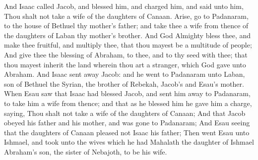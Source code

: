 \begin{biblechapter} %
\verse And Isaac called Jacob, and blessed him, and charged him, and said unto him, Thou shalt not take a wife of the daughters of Canaan.
\verse Arise, go to Padanaram, to the house of Bethuel thy mother's father; and take thee a wife from thence of the daughters of Laban thy mother's brother.
\verse And God Almighty bless thee, and make thee fruitful, and multiply thee, that thou mayest be a multitude of people;
\verse And give thee the blessing of Abraham, to thee, and to thy seed with thee; that thou mayest inherit the land wherein thou art a stranger, which God gave unto Abraham.
\verse And Isaac sent away Jacob: and he went to Padanaram unto Laban, son of Bethuel the Syrian, the brother of Rebekah, Jacob's and Esau's mother.
\verse When Esau saw that Isaac had blessed Jacob, and sent him away to Padanaram, to take him a wife from thence; and that as he blessed him he gave him a charge, saying, Thou shalt not take a wife of the daughters of Canaan;
\verse And that Jacob obeyed his father and his mother, and was gone to Padanaram;
\verse And Esau seeing that the daughters of Canaan pleased not Isaac his father;
\verse Then went Esau unto Ishmael, and took unto the wives which he had Mahalath the daughter of Ishmael Abraham's son, the sister of Nebajoth, to be his wife.

\end{biblechapter}
